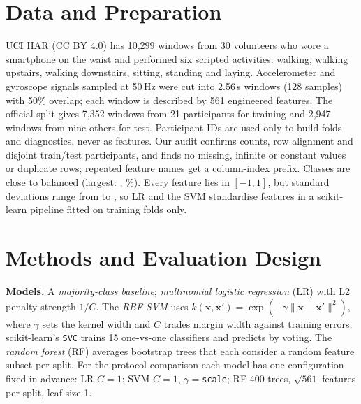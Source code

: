 \documentclass{article}
\begin{document}
\section{Data and Preparation}
UCI HAR \citep{anguita2013,uci_har} (CC BY 4.0) has 10,299 windows from 30 volunteers who wore a smartphone on the waist and performed six scripted activities: walking, walking upstairs, walking downstairs, sitting, standing and laying. Accelerometer and gyroscope signals sampled at 50\,Hz were cut into 2.56\,s windows (128 samples) with 50\% overlap; each window is described by 561 engineered features. The official split gives 7,352 windows from 21 participants for training and 2,947 windows from nine others for test. Participant IDs are used only to build folds and diagnostics, never as features. Our audit confirms counts, row alignment and disjoint train/test participants, and finds no missing, infinite or constant values or duplicate rows; \Ndupnames{} repeated feature names get a column-index prefix. Classes are close to balanced (largest: \Nmajlabel, \Nmajshare\%). Every feature lies in $[-1,1]$, but standard deviations range from \Nsdmin{} to \Nsdmax, so LR and the SVM standardise features in a scikit-learn pipeline \citep{sklearn} fitted on training folds only.

\section{Methods and Evaluation Design}
\textbf{Models.} A \emph{majority-class baseline}; \emph{multinomial logistic regression} (LR) with L2 penalty strength $1/C$. The \emph{RBF SVM} uses $k(\mathbf{x},\mathbf{x}')=\exp(-\gamma\|\mathbf{x}-\mathbf{x}'\|^2)$, where $\gamma$ sets the kernel width and $C$ trades margin width against training errors; scikit-learn's \texttt{SVC} trains 15 one-vs-one classifiers and predicts by voting. The \emph{random forest} (RF) averages bootstrap trees that each consider a random feature subset per split. For the protocol comparison each model has one configuration fixed in advance: LR $C{=}1$; SVM $C{=}1$, $\gamma{=}$\texttt{scale}; RF 400 trees, $\sqrt{561}$ features per split, leaf size 1.
\end{document}
